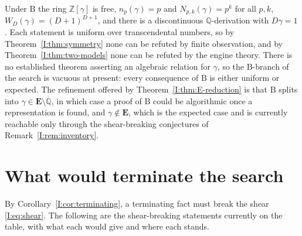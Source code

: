 \documentclass[11pt,a4paper]{article}
\newcommand{\Q}{\mathbb Q}
\newcommand{\Z}{\mathbb Z}
\newcommand{\Qbar}{\overline{\mathbb Q}}
\newcommand{\EE}{\mathbf E}
\theoremstyle{definition}
\theoremstyle{remark}
\numberwithin{equation}{section}
\begin{document}
Under $\mathrm B$ the ring $\Z[\gamma]$ is free, $n_p(\gamma)=p$ and $N_{p,k}(\gamma)=p^k$
for all $p,k$, $W_D(\gamma)=(D+1)^{D+1}$, and there is a discontinuous $\Q$-derivation with
$D\gamma=1$ \cite[Part~VI]{M}. Each statement is uniform over transcendental numbers, so by
Theorem~\ref{I:thm:symmetry} none can be refuted by finite observation, and by
Theorem~\ref{I:thm:two-models} none can be refuted by the engine theory. There is no
established theorem asserting an algebraic relation for $\gamma$, so the
$\mathrm B$-branch of the search is vacuous at present: every consequence of $\mathrm B$
is either uniform or expected. The refinement offered by Theorem~\ref{I:thm:E-reduction} is
that $\mathrm B$ splits into $\gamma\in\EE\setminus\Qbar$, in which case a proof of
$\mathrm B$ could be algorithmic once a representation is found, and $\gamma\notin\EE$,
which is the expected case and is currently reachable only through the shear-breaking
conjectures of Remark~\ref{I:rem:inventory}.

\section{What would terminate the search}\label{I:sec:terminating}

By Corollary~\ref{I:cor:terminating}, a terminating fact must break the shear
\eqref{I:eq:shear}. The following are the shear-breaking statements currently on the table,
with what each would give and where each stands.
\end{document}

